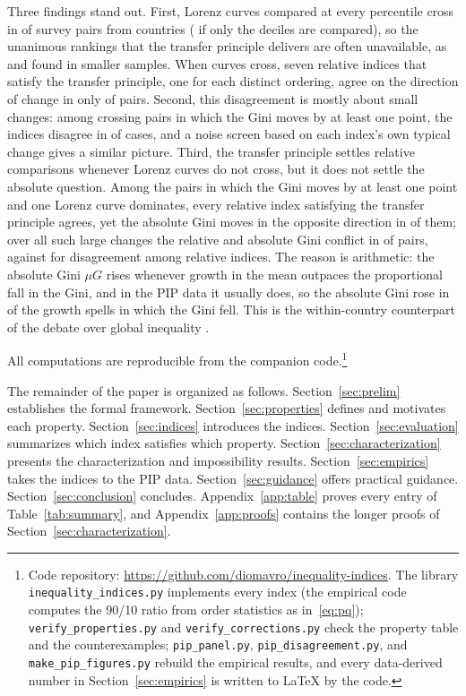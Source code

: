 \documentclass[12pt]{article}
\theoremstyle{plain}
\theoremstyle{definition}
\theoremstyle{remark}
\begin{document}
Three findings stand out.
First, Lorenz curves compared at every percentile cross in \PipShareCross{} of \PipPairs{} survey pairs from \PipCountries{} countries (\PipShareCrossDecile{} if only the deciles are compared), so the unanimous rankings that the transfer principle delivers are often unavailable, as \citet{Atkinson1970} and \citet{Figini2000} found in smaller samples.
When curves cross, seven relative indices that satisfy the transfer principle, one for each distinct ordering, agree on the direction of change in only \PipTpAgreeCross{} of pairs.
Second, this disagreement is mostly about small changes: among crossing pairs in which the Gini moves by at least one point, the indices disagree in \PipTpDisMaterialCross{} of cases, and a noise screen based on each index's own typical change gives a similar picture.
Third, the transfer principle settles relative comparisons whenever Lorenz curves do not cross, but it does not settle the absolute question.
Among the \PipNMaterialDom{} pairs in which the Gini moves by at least one point and one Lorenz curve dominates, every relative index satisfying the transfer principle agrees, yet the absolute Gini moves in the opposite direction in \PipRelAbsOppMaterialDom{} of them; over all such large changes the relative and absolute Gini conflict in \PipRelAbsOppMaterial{} of pairs, against \PipTpDisMaterial{} for disagreement among relative indices.
The reason is arithmetic: the absolute Gini $\mu G$ rises whenever growth in the mean outpaces the proportional fall in the Gini, and in the PIP data it usually does, so the absolute Gini rose in \PipAbsUpGivenGiniDownGrowth{} of the growth spells in which the Gini fell.
This is the within-country counterpart of the debate over global inequality \citep{Ravallion2004,Atkinson2010,NinoZarazua2017}.

All computations are reproducible from the companion code.\footnote{Code repository: \url{https://github.com/diomavro/inequality-indices}. The library \texttt{inequality\_indices.py} implements every index (the empirical code computes the 90/10 ratio from order statistics as in~\eqref{eq:pq}); \texttt{verify\_properties.py} and \texttt{verify\_corrections.py} check the property table and the counterexamples; \texttt{pip\_panel.py}, \texttt{pip\_disagreement.py}, and \texttt{make\_pip\_figures.py} rebuild the empirical results, and every data-derived number in Section~\ref{sec:empirics} is written to \LaTeX{} by the code.}

The remainder of the paper is organized as follows.
Section~\ref{sec:prelim} establishes the formal framework.
Section~\ref{sec:properties} defines and motivates each property.
Section~\ref{sec:indices} introduces the indices.
Section~\ref{sec:evaluation} summarizes which index satisfies which property.
Section~\ref{sec:characterization} presents the characterization and impossibility results.
Section~\ref{sec:empirics} takes the indices to the PIP data.
Section~\ref{sec:guidance} offers practical guidance.
Section~\ref{sec:conclusion} concludes.
Appendix~\ref{app:table} proves every entry of Table~\ref{tab:summary}, and Appendix~\ref{app:proofs} contains the longer proofs of Section~\ref{sec:characterization}.
\end{document}
